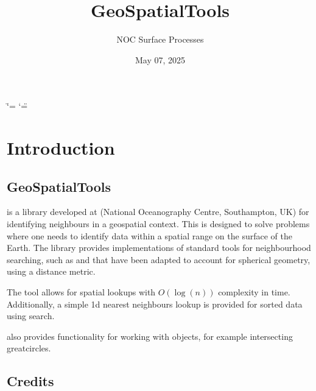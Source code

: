 \documentclass[letterpaper,10pt,english]{sphinxmanual}
\title{GeoSpatialTools}
\date{May 07, 2025}
\author{NOC Surface Processes}
\begin{document}
\ifdefined\shorthandoff
  \ifnum\catcode`\=\string=\active\shorthandoff{=}\fi
  \ifnum\catcode`\"=\active{}\fi
\fi

\pagestyle{empty}
\sphinxmaketitle
\pagestyle{plain}
\sphinxtableofcontents
\pagestyle{normal}
\label{\detokenize{index::doc}}


\sphinxstepscope


\chapter{Introduction}
\label{\detokenize{introduction:introduction}}\label{\detokenize{introduction::doc}}

\section{GeoSpatialTools}
\label{\detokenize{introduction:geospatialtools}}
\sphinxAtStartPar
{} is a  library developed at  (National Oceanography Centre, Southampton, UK) for
identifying neighbours in a geo\sphinxhyphen{}spatial context. This is designed to solve problems where one needs to identify
data within a spatial range on the surface of the Earth. The library provides implementations of standard tools
for neighbourhood searching, such as  and  that have been adapted to account for spherical
geometry, using a  distance metric.

\sphinxAtStartPar
The tool allows for spatial look\sphinxhyphen{}ups with \(O(\log(n))\) complexity in time. Additionally, a simple 1\sphinxhyphen{}d nearest
neighbours look\sphinxhyphen{}up is provided for sorted data using  search.

\sphinxAtStartPar
{} also provides functionality for working with  objects, for example intersecting
great\sphinxhyphen{}circles.


\section{Credits}
\label{\detokenize{introduction:credits}}
\end{document}
